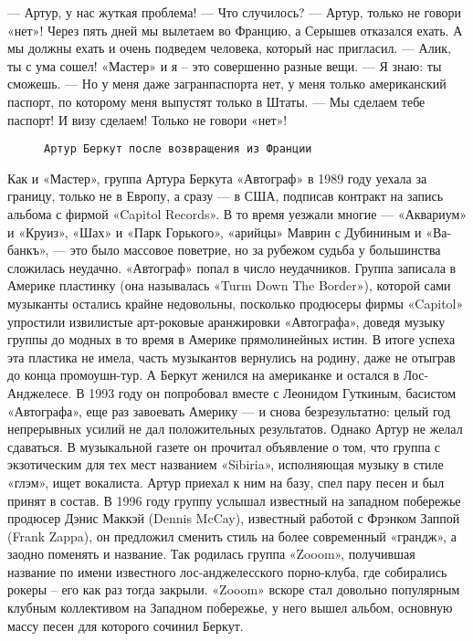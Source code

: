 — Артур, у нас жуткая проблема!
— Что случилось?
— Артур, только не говори «нет»! Через пять дней мы вылетаем во Францию, а Серышев отказался ехать. А мы должны ехать и
очень подведем человека, который нас пригласил.
— Алик, ты с ума сошел! «Мастер» и я – это совершенно разные вещи.
— Я знаю: ты сможешь.
— Но у меня даже загранпаспорта нет, у меня только американский паспорт, по которому меня выпустят только в Штаты.
— Мы сделаем тебе паспорт! И визу сделаем! Только не говори «нет»!

\begin{figure}[h]
    \centering
    \caption{\texttt{Артур Беркут после возвращения из Франции}}
\end{figure}

Как и «Мастер», группа Артура Беркута «Автограф» в 1989 году уехала за границу, только не в Европу, а сразу — в США,
подписав контракт на запись альбома с фирмой «Capitol Records». В то время уезжали многие — «Аквариум» и «Круиз», «Шах»
и «Парк Горького», «арийцы» Маврин с Дубининым и «Ва-банкъ», — это было массовое поветрие, но за рубежом судьба у
большинства сложилась неудачно. «Автограф» попал в число неудачников. Группа записала в Америке пластинку (она
называлась «Turm Down The Border»), которой сами музыканты остались крайне недовольны, посколько продюсеры фирмы
«Capitol» упростили извилистые арт-роковые аранжировки «Автографа», доведя музыку группы до модных в то время в Америке
прямолинейных истин. В итоге успеха эта пластика не имела, часть музыкантов вернулись на родину, даже не отыграв до
конца промоушн-тур. А Беркут женился на американке и остался в Лос-Анджелесе. В 1993 году он попробовал вместе с
Леонидом Гуткиным, басистом «Автографа», еще раз завоевать Америку — и снова безрезультатно: целый год непрерывных
усилий не дал положительных результатов. Однако Артур не желал сдаваться. В музыкальной газете он прочитал объявление о
том, что группа с экзотическим для тех мест названием «Sibiria», исполняющая музыку в стиле «глэм», ищет вокалиста.
Артур приехал к ним на базу, спел пару песен и был принят в состав. В 1996 году группу услышал известный на западном
побережье продюсер Дэнис Маккэй (Dennis McCay), известный работой с Фрэнком Заппой (Frank Zappa), он предложил сменить
стиль на более современный «грандж», а заодно поменять и название. Так родилась группа «Zooom», получившая название по
имени известного лос-анджелесского порно-клуба, где собирались рокеры – его как раз тогда закрыли. «Zooom» вскоре стал
довольно популярным клубным коллективом на Западном побережье, у него вышел альбом, основную массу песен для которого
сочинил Беркут.

